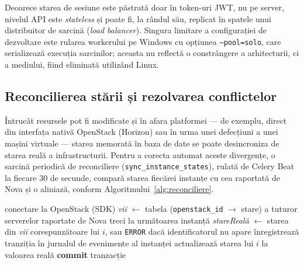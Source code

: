  Deoarece starea de sesiune este păstrată doar în token-uri JWT, nu pe server, nivelul API este \textit{stateless} și poate fi, la rândul său, replicat în spatele unui distribuitor de sarcină (\textit{load balancer}). Singura limitare a configurației de dezvoltare este rularea workerului pe Windows cu opțiunea \texttt{--pool=solo}, care serializează execuția sarcinilor; aceasta nu reflectă o constrângere a arhitecturii, ci a mediului, fiind eliminată utilizând Linux.

\subsection{Reconcilierea stării și rezolvarea conflictelor}
\label{subsec:cap3_reconciliere}

Întrucât resursele pot fi modificate și în afara platformei --- de exemplu, direct din interfața nativă OpenStack (Horizon) sau în urma unei defecțiuni a unei mașini virtuale --- starea memorată în baza de date se poate desincroniza de starea reală a infrastructurii. Pentru a corecta automat aceste divergențe, o sarcină periodică de reconciliere (\texttt{sync\_instance\_states}), rulată de Celery Beat la fiecare 30 de secunde, compară starea fiecărei instanțe cu cea raportată de Nova și o aliniază, conform Algoritmului~\ref{alg:reconciliere}.

\begin{algorithm}[H]
\caption{Reconcilierea periodică a stării instanțelor}
\label{alg:reconciliere}
\begin{algorithmic}[1]
 
    \State conectare la OpenStack (SDK)
    \State \textit{vii} $\gets$ tabela (\texttt{openstack\_id} $\rightarrow$ stare) a tuturor serverelor raportate de Nova
         
            \State treci la următoarea instanță 
        \EndIf
        \State \textit{stareReală} $\gets$ starea din \textit{vii} corespunzătoare lui $i$, sau \texttt{ERROR} dacă identificatorul nu apare
            \State înregistrează tranziția în jurnalul de evenimente al instanței
            \State actualizează starea lui $i$ la valoarea reală 
        \EndIf
    \EndFor
    \State \textbf{commit} tranzacție
\EndProcedure
\end{algorithmic}
\end{algorithm}

